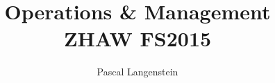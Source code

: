 \documentclass[a4paper]{article}
\title{Operations \& Management \\ ZHAW FS2015}
\author{Pascal Langenstein}
\begin{document}
\maketitle
\newpage

\tableofcontents
\newpage
\begin{abstract}

\end{abstract}




















\newpage
\renewcommand{\indexname}{Stichwortverzeichnis}


\printindex
\end{document}
